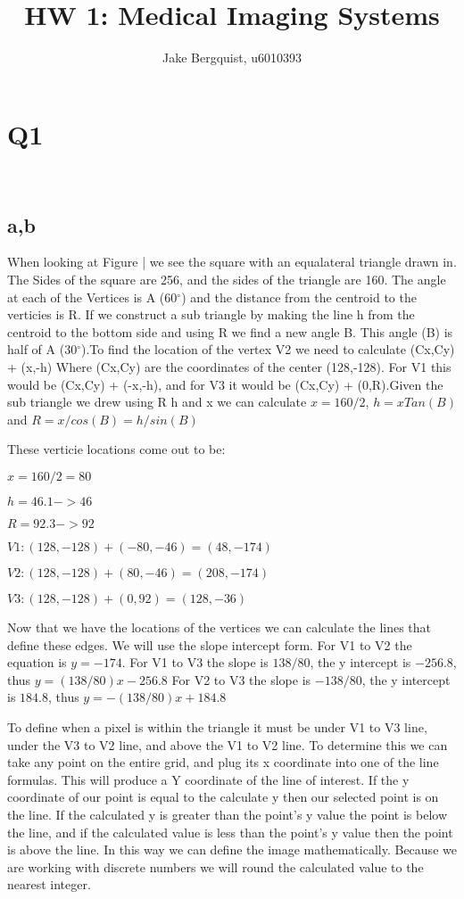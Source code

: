 \documentclass[12pt]{article}
\newcommand{\degrees}{{$^{\circ}$}}
\begin{document}
\title{HW 1: Medical Imaging Systems}
\author{Jake Bergquist, u6010393 }
\maketitle

\section{Q1}\
\subsection{a,b}
When looking at Figure | we see the square with an equalateral triangle drawn in. The Sides of the square are 256, and the sides of the triangle are 160. The angle at each of the Vertices is A (60\degrees) and the distance from the centroid to the verticies is R. If we construct a sub triangle by making the line h from the centroid to the bottom side and using R we find a new angle B. This angle (B) is half of A (30\degrees).To find the location of the vertex V2 we need to calculate (Cx,Cy) + (x,-h) Where (Cx,Cy) are the coordinates of the center (128,-128). For V1 this would be (Cx,Cy) + (-x,-h), and for V3 it would be (Cx,Cy) + (0,R).Given the sub triangle we drew using R h and x we can calculate $x = 160/2$, $h = xTan(B)$ and $R = x/cos(B) =  h/sin(B)$


These verticie locations come out to be:

$x = 160/2 = 80$

$h = 46.1 -> 46$

$R = 92.3 -> 92$

$V1: (128,-128) + (-80,-46) = (48,-174)$

$V2: (128,-128) + (80,-46) = (208,-174)$

$V3 : (128,-128) + (0,92) = (128,-36)$

Now that we have the locations of the vertices we can calculate the lines that define these edges. We will use the slope intercept form.
For V1 to V2 the equation is $y = -174$.
For V1 to V3 the slope is $138/80$, the y intercept is $-256.8$, thus $y = (138/80)x - 256.8$
For V2 to V3 the slope is $-138/80$, the y intercept is $184.8$, thus $y = -(138/80)x + 184.8$

To define when a pixel is within the triangle it must be under V1 to V3 line, under the V3 to V2 line, and above the V1 to V2 line. To determine this we can take any point on the entire grid, and plug its x coordinate into one of the line formulas. This will produce a Y coordinate of the line of interest. If the y coordinate of our point is equal to the calculate y then our selected point is on the line. If the calculated y is greater than the point's y value the point is below the line, and if the calculated value is less than the point's y value then the point is above the line. In this way we can define the image mathematically. Because we are working with discrete numbers we will round the calculated value to the nearest integer.





\end{document}
